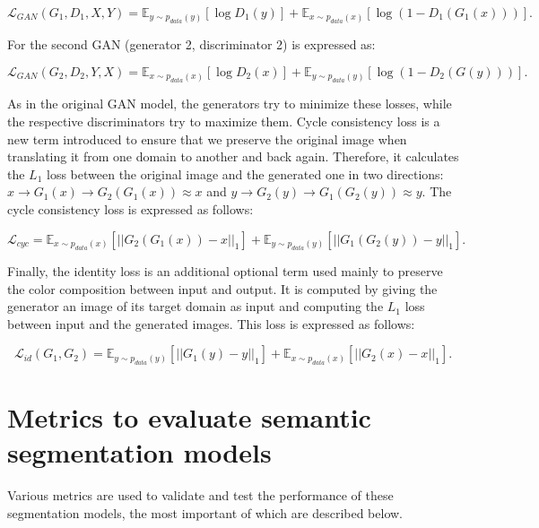 \begin{equation} \mathcal{L}_{ GAN }(G_1,D_1,X,Y)=\mathbb{E}_{y\sim p_{data}(y)}[\log{D_1(y)}]+\mathbb{E}_{x\sim p_{data}(x)}[\log{(1-D_1(G_1(x)))}]. 
\end{equation} 

For the second \ac{GAN} (generator 2, discriminator 2) is expressed as:

\begin{equation} \mathcal{L}_{ GAN }(G_2,D_2,Y,X)=\mathbb{E}_{x\sim p_{data}(x)}[\log{D_2(x)}]+\mathbb{E}_{y\sim p_{data}(y)}[\log{(1-D_2(G(y)))}]. 
\end{equation}
 
As in the original \ac{GAN} model, the generators try to minimize these losses, while the respective discriminators try to maximize them. Cycle consistency loss is a new term introduced to ensure that we preserve the original image when translating it from one domain to another and back again. Therefore, it calculates the $L_1$ loss between the original image and the generated one in two directions: $x \rightarrow G_1(x) \rightarrow G_2(G_1(x)) \approx x$ and $y \rightarrow G_2(y) \rightarrow G_1(G_2(y)) \approx y$. The cycle consistency loss is expressed as follows:

\begin{equation} 
\mathcal{L}_{cyc} = \mathbb{E}_{x\sim p_{data}(x)} [||G_{2}(G_{1}(x))-x||_1] + \mathbb{E}_{y\sim p_{data}(y)} [||G_{1}(G_{2}(y))-y||_1].
\label{eq:CCL}
\end{equation}

Finally, the identity loss is an additional optional term used mainly to preserve the color composition between input and output. It is computed by giving the generator an image of its target domain as input and computing the $L_1$ loss between input and the generated images. This loss is expressed as follows:

\begin{equation} 
\mathcal{L}_{id}(G_1,G_2) = \mathbb{E}_{y\sim p_{data}(y)} [||G_{1}(y)-y||_1] + \mathbb{E}_{x\sim p_{data}(x)} [||G_{2}(x)-x||_1].
\label{eq:identity}
\end{equation}

\section{Metrics to evaluate semantic segmentation models}

Various metrics are used to validate and test the performance of these segmentation models, the most important of which are described below.

